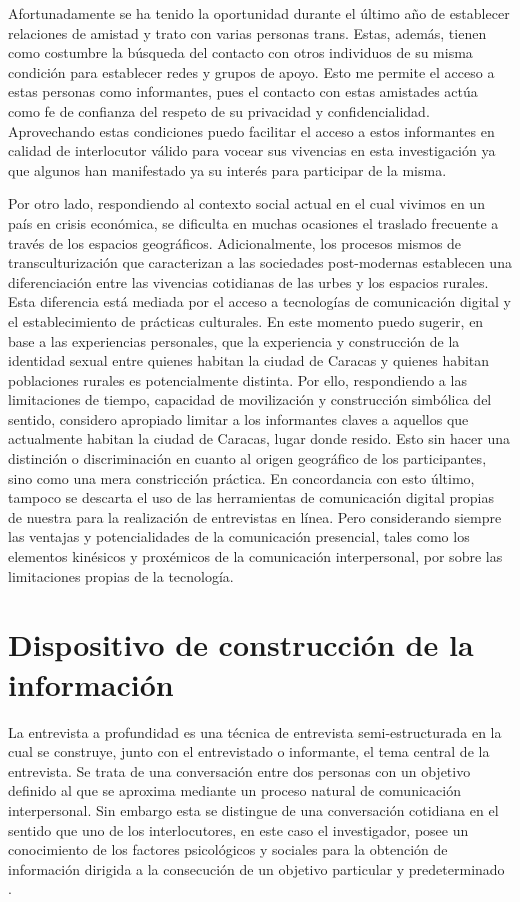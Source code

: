 	Afortunadamente se ha tenido la oportunidad durante el último año de establecer
relaciones de amistad y trato con varias personas trans. Estas, además, tienen
como costumbre la búsqueda del contacto con otros individuos de su misma
condición para establecer redes y grupos de apoyo. Esto me permite el acceso a
estas personas como informantes, pues el contacto con estas amistades actúa como
fe de confianza del respeto de su privacidad y confidencialidad. Aprovechando
estas condiciones puedo facilitar el acceso a estos informantes en calidad de
interlocutor válido para vocear sus vivencias en esta investigación ya que
algunos han manifestado ya su interés para participar de la misma.

	Por otro lado, respondiendo al contexto social actual en el cual vivimos en un
país en crisis económica, se dificulta en muchas ocasiones el traslado
frecuente a través de los espacios geográficos. Adicionalmente, los procesos
mismos de transculturización que caracterizan a las sociedades post-modernas
establecen una diferenciación entre las vivencias cotidianas de las urbes y los
espacios rurales. Esta diferencia está mediada por el acceso a tecnologías de
comunicación digital y el establecimiento de prácticas culturales. En este
momento puedo sugerir, en base a las experiencias personales, que la
experiencia y construcción de la identidad sexual entre quienes habitan la
ciudad de Caracas y quienes habitan poblaciones rurales es potencialmente
distinta. Por ello, respondiendo a las limitaciones de tiempo, capacidad de
movilización y construcción simbólica del sentido, considero apropiado limitar
a los informantes claves a aquellos que actualmente habitan la ciudad de
Caracas, lugar donde resido. Esto sin hacer una distinción o discriminación en
cuanto al origen geográfico de los participantes, sino como una mera
constricción práctica. En concordancia con esto último, tampoco se descarta el
uso de las herramientas de comunicación digital propias de nuestra para la
realización de entrevistas en línea. Pero considerando siempre las ventajas y
potencialidades de la comunicación presencial, tales como los elementos
kinésicos y proxémicos de la comunicación interpersonal, por sobre las
limitaciones propias de la tecnología.

\section{Dispositivo de construcción de la información}

La entrevista a profundidad es una técnica de entrevista semi-estructurada en
la cual se construye, junto con el entrevistado o informante, el tema central
de la entrevista. Se trata de una conversación entre dos personas con un
objetivo definido al que se aproxima mediante un proceso natural de
comunicación interpersonal. Sin embargo esta se distingue de una conversación
cotidiana en el sentido que uno de los interlocutores, en este caso el
investigador, posee un conocimiento de los factores psicológicos y sociales
para la obtención de información dirigida a la consecución de un objetivo
particular y predeterminado \parencite{Hidalgo2005}.

